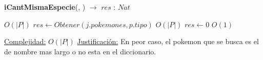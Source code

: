 \begin{algorithm}[H]{\textbf{iCantMismaEspecie}(, ) $\to$ $res$ : $Nat$} 
	{}
	\begin{algorithmic}
		 \Comment $O(|P|)$
		\State $res \gets Obtener(j.pokemones, p.tipo)$ \Comment $O(|P|)$
		\Else
		\State $res \gets 0 $ \Comment $O(1)$
		\EndIf
	
		\medskip
		\Statex \underline{Complejidad:} $O(|P|)$
		\Statex \underline{Justificación:} En peor caso, el pokemon que se busca es el de nombre mas largo o no esta en el diccionario.
    \end{algorithmic}
\end{algorithm}